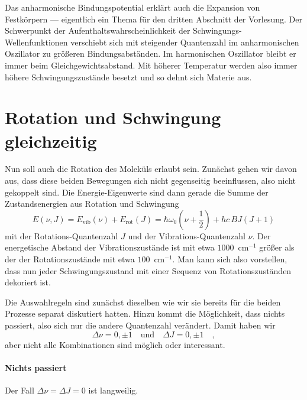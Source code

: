  
 
Das anharmonische Bindungspotential erklärt auch die Expansion von Festkörpern --- eigentlich ein Thema für den dritten Abschnitt der Vorlesung. Der Schwerpunkt der Aufenthaltswahrscheinlichkeit der Schwingungs-Wellenfunktionen verschiebt sich mit steigender Quantenzahl im anharmonischen Oszillator zu größeren Bindungsabständen. Im harmonischen Oszillator bleibt er immer beim Gleichgewichtsabstand. Mit höherer Temperatur werden also immer höhere Schwingungszustände besetzt und so dehnt sich Materie aus.


\section{Rotation und Schwingung gleichzeitig}

Nun soll auch die Rotation des Moleküls erlaubt sein. Zunächst gehen wir davon aus, dass diese beiden Bewegungen sich nicht gegenseitig beeinflussen, also nicht gekoppelt sind. Die Energie-Eigenwerte sind dann gerade die Summe der Zustandsenergien aus Rotation und Schwingung
\begin{equation}
E (\nu, J) = E_\text{vib}(\nu) + E_\text{rot}(J) = \hbar \omega_0 \left(\nu + \frac{1}{2} \right) + h c \, B J \left( J+1 \right) \label{eq:vib_rot_simple}
\end{equation}
mit der Rotations-Quantenzahl $J$ und der Vibrations-Quantenzahl $\nu$. Der energetische Abstand der Vibrationszustände ist mit etwa $1000$~cm$^{-1}$  größer als der der Rotationszustände mit etwa $100$~cm$^{-1}$. Man kann sich also vorstellen, dass nun jeder Schwingungszustand mit einer Sequenz von Rotationszuständen dekoriert ist.

Die Auswahlregeln sind zunächst dieselben wie wir sie bereits für die beiden Prozesse separat diskutiert hatten. Hinzu kommt die Möglichkeit, dass nichts passiert, also sich nur die andere Quantenzahl verändert. Damit haben wir
\begin{equation}
 \Delta \nu = 0, \pm 1 \quad \text{und} \quad \Delta J = 0, \pm 1  \quad ,
\end{equation}
aber nicht alle Kombinationen sind möglich oder interessant.

\paragraph{Nichts passiert} Der Fall $\Delta \nu = \Delta J = 0$ ist langweilig.

